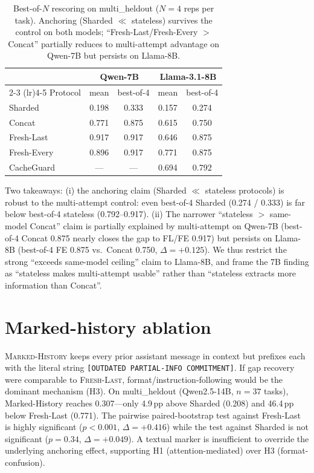 \documentclass{article}
\begin{document}
\begin{table}[h]
\centering
\caption{Best-of-$N$ rescoring on multi\_heldout ($N=4$ reps per task). Anchoring (Sharded $\ll$ stateless) survives the control on both models; ``Fresh-Last/Fresh-Every $>$ Concat'' partially reduces to multi-attempt advantage on Qwen-7B but persists on Llama-8B.}
\label{tab:bestofN}
\begin{tabular}{lcccc}
\toprule
& \multicolumn{2}{c}{Qwen-7B} & \multicolumn{2}{c}{Llama-3.1-8B} \\
\cmidrule(lr){2-3} \cmidrule(lr){4-5}
Protocol & mean & best-of-4 & mean & best-of-4 \\
\midrule
Sharded & 0.198 & 0.333 & 0.157 & 0.274 \\
Concat & 0.771 & 0.875 & 0.615 & 0.750 \\
Fresh-Last & 0.917 & 0.917 & 0.646 & 0.875 \\
Fresh-Every & 0.896 & 0.917 & 0.771 & 0.875 \\
CacheGuard & --- & --- & 0.694 & 0.792 \\
\bottomrule
\end{tabular}
\end{table}

Two takeaways: (i) the anchoring claim (Sharded $\ll$ stateless protocols) is robust to the multi-attempt control: even best-of-4 Sharded (0.274 / 0.333) is far below best-of-4 stateless (0.792--0.917). (ii) The narrower ``stateless $>$ same-model Concat'' claim is partially explained by multi-attempt on Qwen-7B (best-of-4 Concat 0.875 nearly closes the gap to FL/FE 0.917) but persists on Llama-8B (best-of-4 FE 0.875 vs.\ Concat 0.750, $\Delta{=}{+}0.125$). We thus restrict the strong ``exceeds same-model ceiling'' claim to Llama-8B, and frame the 7B finding as ``stateless makes multi-attempt usable'' rather than ``stateless extracts more information than Concat''.

\section{Marked-history ablation}
\label{app:marked}

\textsc{Marked-History} keeps every prior assistant message in context but prefixes each with the literal string \texttt{[OUTDATED PARTIAL-INFO COMMITMENT]}. If gap recovery were comparable to \textsc{Fresh-Last}, format/instruction-following would be the dominant mechanism (H3). On multi\_heldout (Qwen2.5-14B, $n=37$ tasks), Marked-History reaches 0.307---only 4.9\,pp above Sharded (0.208) and 46.4\,pp below Fresh-Last (0.771). The pairwise paired-bootstrap test against Fresh-Last is highly significant ($p < 0.001$, $\Delta = +0.416$) while the test against Sharded is not significant ($p = 0.34$, $\Delta = +0.049$). A textual marker is insufficient to override the underlying anchoring effect, supporting H1 (attention-mediated) over H3 (format-confusion).
\end{document}
